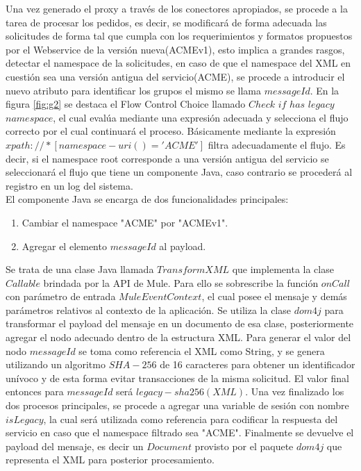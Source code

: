 \documentclass[12pt]{article}
\begin{document}
Una vez generado el proxy a través de los conectores apropiados, se procede a la tarea de procesar los pedidos, es decir, se modificará de forma adecuada las solicitudes de forma tal que cumpla con los requerimientos y formatos propuestos por el Webservice de la versión nueva(ACMEv1), esto implica a grandes rasgos, detectar el namespace de la solicitudes, en caso de que el namespace del XML en cuestión sea una versión antigua del servicio(ACME), se procede a introducir el nuevo atributo para identificar los grupos el mismo se llama $messageId$.
En la figura \ref{fig:g2} se destaca el Flow Control Choice llamado $Check$ $if$ $has$ $legacy$ $namespace$, el cual evalúa mediante una expresión adecuada y selecciona el flujo correcto por el cual continuará el proceso.
Básicamente mediante la expresión $xpath://*[namespace-uri()='ACME']$ filtra adecuadamente el flujo. Es decir, si el namespace root corresponde a una versión antigua del servicio se seleccionará el flujo que tiene un componente Java, caso contrario se procederá al registro en un log del sistema. \\

El componente Java se encarga de dos funcionalidades principales:
\begin{enumerate}
  \item Cambiar el namespace "ACME" por "ACMEv1".
  \item Agregar el elemento $messageId$ al payload.
\end{enumerate}
Se trata de una clase Java llamada $TransformXML$ que implementa la clase $Callable$ brindada por la API de Mule. Para ello se sobrescribe la función $onCall$ con parámetro de entrada $MuleEventContext$, el cual posee el mensaje y demás parámetros relativos al contexto de la aplicación. Se utiliza la clase $dom4j$ para transformar el payload del mensaje en un documento de esa clase, posteriormente agregar el nodo adecuado dentro de la estructura XML.
Para generar el valor del nodo $messageId$ se toma como referencia el XML como String, y se genera utilizando un algoritmo $SHA-256$ de 16 caracteres para obtener un identificador unívoco y de esta forma evitar transacciones de la misma solicitud. El valor final entonces para $messageId$ será $legacy-sha256(XML)$. Una vez finalizado los dos procesos principales, se procede a agregar una variable de sesión con nombre $isLegacy$, la cual será utilizada como referencia para codificar la respuesta del servicio en caso que el namespace filtrado sea "ACME". Finalmente se devuelve el payload del mensaje, es decir un $Document$ provisto por el paquete $dom4j$ que representa el XML para posterior procesamiento.
\end{document}
